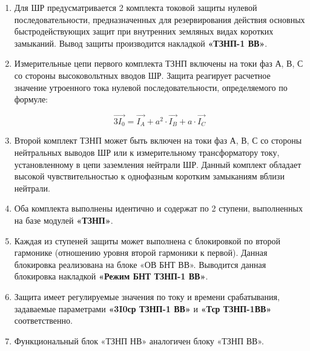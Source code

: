 \color{black}

\begin{enumerate}[label=\arabic{section}.\arabic{subsection}.\arabic*,  align=left, labelsep=4pt, leftmargin=0pt, itemindent=57pt]

\item
Для ШР предусматривается 2 комплекта токовой защиты нулевой последовательности,
предназначенных для резервирования действия основных быстродействующих защит при внутренних
земляных видах коротких замыканий. Вывод защиты производится накладкой \textbf{«ТЗНП-1 ВВ»}.

\item
Измерительные цепи первого комплекта ТЗНП включены на токи фаз А, В, С со стороны
высоковольтных вводов ШР. Защита реагирует расчетное значение утроенного тока нулевой
последовательности, определяемого по формуле:

\begin{equation}
\vec{3I_{0}} = \vec{I_{A}} + a^2 \cdot \vec{I_{B}} + a \cdot \vec{I_{C}}
\end{equation}

\item
Второй комплект ТЗНП может быть включен на токи фаз А, В, С со стороны нейтральных выводов
ШР или к измерительному трансформатору току, установленному в цепи заземления нейтрали ШР.
Данный комплект обладает высокой чувствительностью к однофазным коротким замыканиям вблизи
нейтрали.

\item
Оба комплекта выполнены идентично и содержат по 2 ступени, выполненных на базе модулей \textbf{«ТЗНП»}. 

\item
Каждая из ступеней защиты может выполнена с блокировкой по второй гармонике (отношению
уровня второй гармоники к первой). Данная блокировка реализована на блоке «ОВ БНТ ВВ».
Выводится данная блокировка накладкой \textbf{«Режим БНТ ТЗНП-1 ВВ»}.

\item
Защита имеет регулируемые значения по току и времени срабатывания, задаваемые
параметрами \textbf{«3I0ср ТЗНП-1 ВВ»} и \textbf{«Тср ТЗНП-1ВВ»} соответственно.

\item
Функциональный блок «ТЗНП НВ» аналогичен блоку «ТЗНП ВВ».


\end{enumerate}
